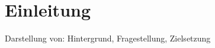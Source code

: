 \chapter{Einleitung}
\label{ch:einleitung}

Darstellung von: Hintergrund, Fragestellung, Zielsetzung
